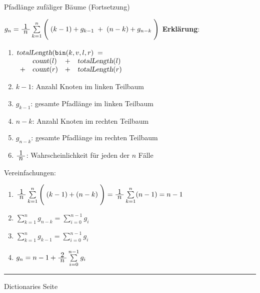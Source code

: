 
\begin{slide}{}
\normalsize

\begin{center}
Pfadl\"ange zuf\"aliger B\"aume (Fortsetzung)
\end{center}
\vspace*{0.5cm}

\footnotesize
\hspace*{1.3cm} $g_n = \frac{\displaystyle\;1\;}{\displaystyle\;n\;} \sum\limits_{k=1}^n \Bigg(\; (k - 1) + g_{k-1} \;+\; (n-k) + g_{n-k} \;\Bigg)$
\textbf{Erkl\"arung}:
\begin{enumerate}
\item $\textsl{totalLength}(\mathtt{bin}(k,v,l,r) \;= $\\[0.3cm]
\hspace*{1.3cm} $
\begin{array}{llclc}
     & \textsl{count}(l) & + & \textsl{totalLength}(l)  \\
   + & \textsl{count}(r) & + & \textsl{totalLength}(r) \\
\end{array}$
\item $k - 1$: Anzahl Knoten im linken Teilbaum
\item $g_{k-1}$: gesamte Pfadl\"ange im linken Teilbaum
\item $n - k$: Anzahl Knoten im rechten Teilbaum
\item $g_{n-k}$: gesamte Pfadl\"ange im rechten Teilbaum
\item $\frac{\displaystyle\;1\;}{\displaystyle\;n\;}$: Wahrscheinlichkeit f\"ur jeden der $n$ F\"alle
\end{enumerate}
Vereinfachungen: 
\begin{enumerate}
\item  $\frac{\displaystyle\;1\;}{\displaystyle\;n\;} \sum\limits_{k=1}^n \Bigg(\; (k-1) + (n-k) \;\Bigg) = \frac{\displaystyle\;1\;}{\displaystyle\;n\;} \sum\limits_{k=1}^n (n-1) = n - 1$
\item $\sum\limits_{k=1}^n g_{n-k} = \sum\limits_{i=0}^{n-1} g_i$
\item $\sum\limits_{k=1}^n g_{k-1} = \sum\limits_{i=0}^{n-1} g_i$
\item $g_n = n - 1 + \frac{\displaystyle\;2\;}{\displaystyle\;n\;} \sum\limits_{i=0}^{n-1} g_i$
\end{enumerate}


\vspace*{\fill}
\tiny \addtocounter{mypage}{1}
\rule{17cm}{1mm}
Dictionaries  \hspace*{\fill} Seite 
\end{slide}

